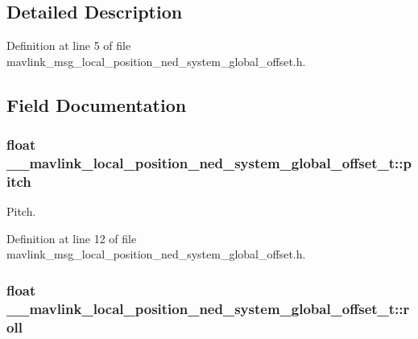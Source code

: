\subsection{Detailed Description}


Definition at line 5 of file mavlink\-\_\-msg\-\_\-local\-\_\-position\-\_\-ned\-\_\-system\-\_\-global\-\_\-offset.\-h.



\subsection{Field Documentation}
\hypertarget{struct____mavlink__local__position__ned__system__global__offset__t_abf94231c7acd5e41896e5fdf98cd0128}{
\subsubsection[{pitch}]{\setlength{\rightskip}{0pt plus 5cm}float \-\_\-\-\_\-mavlink\-\_\-local\-\_\-position\-\_\-ned\-\_\-system\-\_\-global\-\_\-offset\-\_\-t\-::pitch}}\label{struct____mavlink__local__position__ned__system__global__offset__t_abf94231c7acd5e41896e5fdf98cd0128}


Pitch. 



Definition at line 12 of file mavlink\-\_\-msg\-\_\-local\-\_\-position\-\_\-ned\-\_\-system\-\_\-global\-\_\-offset.\-h.

\hypertarget{struct____mavlink__local__position__ned__system__global__offset__t_ad4d99c9821f0ee3d85c2a0eba615a8c8}{
\subsubsection[{roll}]{\setlength{\rightskip}{0pt plus 5cm}float \-\_\-\-\_\-mavlink\-\_\-local\-\_\-position\-\_\-ned\-\_\-system\-\_\-global\-\_\-offset\-\_\-t\-::roll}}\label{struct____mavlink__local__position__ned__system__global__offset__t_ad4d99c9821f0ee3d85c2a0eba615a8c8}


